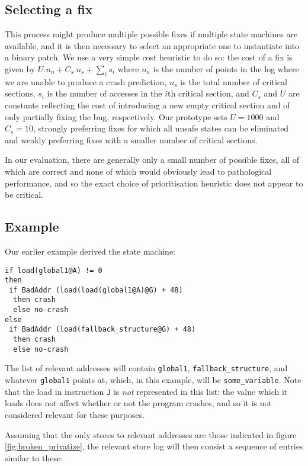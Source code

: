 \documentclass[10pt,twocolumn,preprint,natbib,authoryear]{sigplanconf}
\begin{document}
\subsection{Selecting a fix}
\label{sect:selectfix}

This process might produce multiple possible fixes if multiple state
machines are available, and it is then necessary to select an
appropriate one to instantiate into a binary patch.  We use a very
simple cost heuristic to do so: the cost of a fix is given by $U.n_u +
C_s.n_s + {\sum_{i}}s_i$ where $n_u$ is the number of points in the
log where we are unable to produce a crash prediction, $n_s$ is the
total number of critical sections, $s_i$ is the number of accesses in
the $i$th critical section, and $C_s$ and $U$ are constants reflecting
the cost of introducing a new empty critical section and of only
partially fixing the bug, respectively.  Our prototype sets $U=1000$
and $C_s=10$, strongly preferring fixes for which all unsafe states
can be eliminated and weakly preferring fixes with a smaller number of
critical sections.

In our evaluation, there are generally only a small number of possible
fixes, all of which are correct and none of which would obviously lead
to pathological performance, and so the exact choice of prioritisation
heuristic does not appear to be critical.

\subsection{Example}
\label{sect:final_example}

Our earlier example derived the state machine:

\begin{verbatim}
if load(global1@A) != 0
then
 if BadAddr (load(load(global1@A)@G) + 48)
  then crash
  else no-crash
else
 if BadAddr (load(fallback_structure@G) + 48)
  then crash
  else no-crash
\end{verbatim}

The list of relevant addresses will contain \verb|global1|,
\verb|fallback_structure|, and whatever \verb|global1| points at,
which, in this example, will be \verb|some_variable|.  Note that the
load in instruction \verb|J| is \emph{not} represented in this list:
the value which it loads does not affect whether or not the program
crashes, and so it is not considered relevant for these purposes.

Assuming that the only stores to relevant addresses are those
indicated in figure \ref{fig:broken_privatize}, the relevant store log
will then consist a sequence of entries similar to these:
\end{document}
